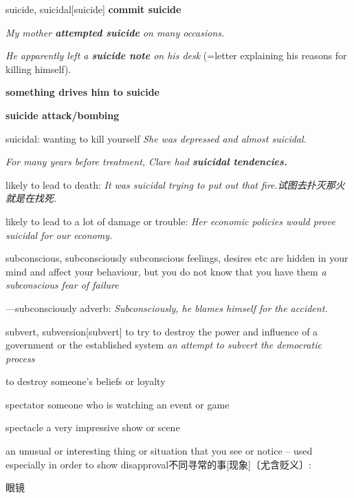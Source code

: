 \begin{DefWord}{suicide, suicidal}[suicide]
    \textbf{commit suicide}

    \textit{My mother \textbf{attempted suicide} on many occasions.}

    \textit{He apparently left a \textbf{suicide note} on his desk} (=letter explaining his reasons for killing himself).

    \textbf{something drives him to suicide}

    \textbf{suicide attack/bombing}

    suicidal: 
    wanting to kill yourself
    \textit{She was depressed and almost suicidal.}

    \textit{For many years before treatment, Clare had \textbf{suicidal tendencies.}}

    likely to lead to death:
    \textit{It was suicidal trying to put out that fire.试图去扑灭那火就是在找死. }

    likely to lead to a lot of damage or trouble: 
    \textit{Her economic policies would prove suicidal for our economy.}
\end{DefWord}

\begin{DefWord}{subconscious, subconsciously}
    subconscious feelings, desires etc are hidden in your mind and affect your behaviour, but you do not know that you have them
    \textit{a subconscious fear of failure}

    —subconsciously adverb:
    \textit{Subconsciously, he blames himself for the accident.}
\end{DefWord}

\begin{DefWord}{subvert, subversion}[subvert]
    to try to destroy the power and influence of a government or the established system
    \textit{an attempt to subvert the democratic process}

    to destroy someone's beliefs or loyalty
\end{DefWord}

\begin{DefWord}{spectator}
    someone who is watching an event or game


\end{DefWord}

\begin{DefWord}{spectacle}
    a very impressive show or scene

    an unusual or interesting thing or situation that you see or notice – used especially in order to show disapproval不同寻常的事[现象]〔尤含贬义〕:

    眼镜
\end{DefWord}

